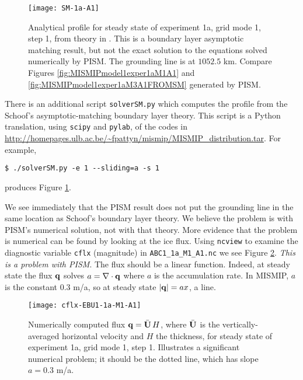 \begin{figure}[ht]
\centering
\texttt{[image: SM-1a-A1]}
\caption{Analytical profile for steady state of experiment 1a, grid mode 1, step 1, from theory in \cite{SchoofMarine1}.  This is a boundary layer asymptotic matching result, but not the exact solution to the equations solved numerically by PISM.  The grounding line is at $1052.5$ km.  Compare Figures \ref{fig:MISMIPmodel1exper1aM1A1} and \ref{fig:MISMIPmodel1exper1aM3A1FROMSM} generated by PISM.}
\label{fig:SMexper1aM1A1}
\end{figure}

There is an additional script \texttt{solverSM.py} which computes the profile from the Schoof's \cite{SchoofMarine1} asymptotic-matching boundary layer theory.  This script is a Python translation, using \texttt{scipy} and \texttt{pylab}, of the \Matlab codes in \url{http://homepages.ulb.ac.be/~fpattyn/mismip/MISMIP_distribution.tar}.  For example,

\begin{verbatim}
$ ./solverSM.py -e 1 --sliding=a -s 1
\end{verbatim}

\noindent produces Figure \ref{fig:SMexper1aM1A1}.

We see immediately that the PISM result does not put the grounding line in the same location as Schoof's boundary layer theory.  We believe the problem is with PISM's numerical solution, not with that theory.  More evidence that the problem is numerical can be found by looking at the ice flux.  Using \texttt{ncview} to examine the diagnostic variable \texttt{cflx} (magnitude) in \texttt{ABC1_1a_M1_A1.nc} we see Figure \ref{fig:cflx1aM1A1}.  \emph{This is a problem with PISM}.  The flux should be a linear function.  Indeed, at steady state the flux $\mathbf{q}$ solves $a=\nabla\cdot\mathbf{q}$ where $a$ is the accumulation rate.  In MISMIP, $a$ is the constant $0.3$ m/a, so at steady state $|\mathbf{q}| = a x$, a line.

\begin{figure}[ht]
\centering
\texttt{[image: cflx-EBU1-1a-M1-A1]}
\caption{Numerically computed flux $\mathbf{q} = \bar{\mathbf{U}}\, H$, where $\bar{\mathbf{U}}$ is the vertically-averaged horizontal velocity and $H$ the thickness, for steady state of experiment 1a, grid mode 1, step 1.  Illustrates a significant numerical problem; it should be the dotted line, which has slope $a = 0.3$ m/a.}
\label{fig:cflx1aM1A1}
\end{figure}

